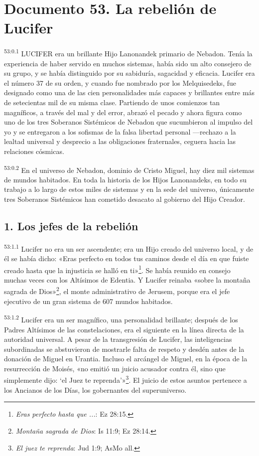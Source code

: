 \chapter{Documento 53. La rebelión de Lucifer}
\par
\textsuperscript{53:0.1} LUCIFER era un brillante Hijo Lanonandek primario de Nebadon. Tenía la experiencia de haber servido en muchos sistemas, había sido un alto consejero de su grupo, y se había distinguido por su sabiduría, sagacidad y eficacia. Lucifer era el número 37 de su orden, y cuando fue nombrado por los Melquisedeks, fue designado como una de las cien personalidades más capaces y brillantes entre más de setecientas mil de su misma clase. Partiendo de unos comienzos tan magníficos, a través del mal y del error, abrazó el pecado y ahora figura como uno de los tres Soberanos Sistémicos de Nebadon que sucumbieron al impulso del yo y se entregaron a los sofismas de la falsa libertad personal ---rechazo a la lealtad universal y desprecio a las obligaciones fraternales, ceguera hacia las relaciones cósmicas.

\par
\textsuperscript{53:0.2} En el universo de Nebadon, dominio de Cristo Miguel, hay diez mil sistemas de mundos habitados. En toda la historia de los Hijos Lanonandeks, en todo su trabajo a lo largo de estos miles de sistemas y en la sede del universo, únicamente tres Soberanos Sistémicos han cometido desacato al gobierno del Hijo Creador.

\section*{1. Los jefes de la rebelión}
\par
\textsuperscript{53:1.1} Lucifer no era un ser ascendente; era un Hijo creado del universo local, y de él se había dicho: «Eras perfecto en todos tus caminos desde el día en que fuiste creado hasta que la injusticia se halló en ti»\footnote{\textit{Eras perfecto hasta que ...}: Ez 28:15.}. Se había reunido en consejo muchas veces con los Altísimos de Edentia. Y Lucifer reinaba «sobre la montaña sagrada de Dios»\footnote{\textit{Montaña sagrada de Dios}: Is 11:9; Ez 28:14.}, el monte administrativo de Jerusem, porque era el jefe ejecutivo de un gran sistema de 607 mundos habitados.

\par
\textsuperscript{53:1.2} Lucifer era un ser magnífico, una personalidad brillante; después de los Padres Altísimos de las constelaciones, era el siguiente en la línea directa de la autoridad universal. A pesar de la transgresión de Lucifer, las inteligencias subordinadas se abstuvieron de mostrarle falta de respeto y desdén antes de la donación de Miguel en Urantia. Incluso el arcángel de Miguel, en la época de la resurrección de Moisés, «no emitió un juicio acusador contra él, sino que simplemente dijo: `el Juez te reprenda'»\footnote{\textit{El juez te reprenda}: Jud 1:9; AsMo all.}. El juicio de estos asuntos pertenece a los Ancianos de los Días, los gobernantes del superuniverso.


